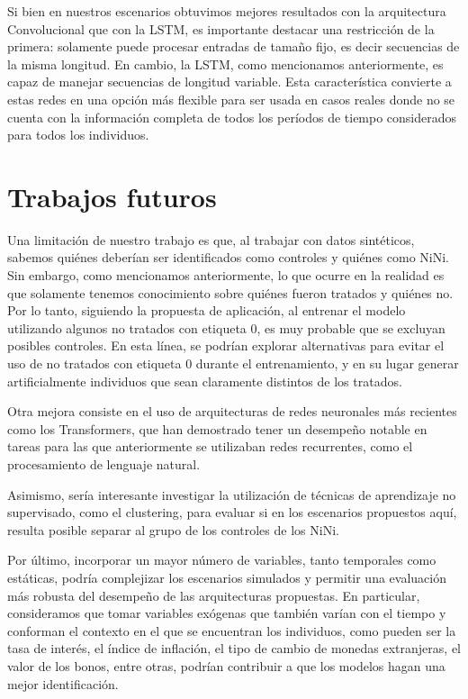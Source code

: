 \documentclass[../main.tex]{subfiles}
\begin{document}
Si bien en nuestros escenarios obtuvimos mejores resultados con la arquitectura
Convolucional que con la LSTM, es importante destacar una restricción de la primera:
solamente puede procesar entradas de tamaño fijo, es decir secuencias de la misma
longitud. En cambio, la LSTM, como mencionamos anteriormente, es capaz de manejar
secuencias de longitud variable. Esta característica convierte a estas redes en una opción
más flexible para ser usada en casos reales donde no se cuenta con la información completa
de todos los períodos de tiempo considerados para todos los individuos.

\section{Trabajos futuros}
Una limitación de nuestro trabajo es que, al trabajar con datos sintéticos, sabemos
quiénes deberían ser identificados como controles y quiénes como NiNi. Sin embargo, como
mencionamos anteriormente, lo que ocurre en la realidad es que solamente tenemos
conocimiento sobre quiénes fueron tratados y quiénes no. Por lo tanto, siguiendo la
propuesta de aplicación, al entrenar el modelo utilizando algunos no tratados con etiqueta
0, es muy probable que se excluyan posibles controles. En esta línea, se podrían explorar
alternativas para evitar el uso de no tratados con etiqueta 0 durante el entrenamiento, y
en su lugar generar artificialmente individuos que sean claramente distintos de los
tratados.

Otra mejora consiste en el uso de arquitecturas de redes neuronales más recientes como los
Transformers, que han demostrado tener un desempeño notable en tareas para las que
anteriormente se utilizaban redes recurrentes, como el procesamiento de lenguaje natural.

Asimismo, sería interesante investigar la utilización de técnicas de aprendizaje no
supervisado, como el clustering, para evaluar si en los escenarios propuestos aquí,
resulta posible separar al grupo de los controles de los NiNi.

Por último, incorporar un mayor número de variables, tanto temporales como estáticas,
podría complejizar los escenarios simulados y permitir una evaluación más robusta del
desempeño de las arquitecturas propuestas. En particular, consideramos que tomar variables
exógenas que también varían con el tiempo y conforman el contexto en el que se encuentran
los individuos, como pueden ser la tasa de interés, el índice de inflación, el tipo de
cambio de monedas extranjeras, el valor de los bonos, entre otras, podrían contribuir a
que los modelos hagan una mejor identificación.
\end{document}
